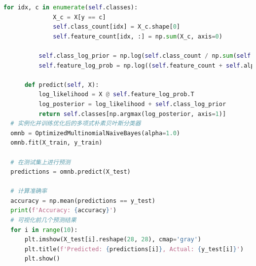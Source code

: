 \documentclass[12pt]{article}
\begin{document}
\begin{lstlisting}[language=Python]
          for idx, c in enumerate(self.classes):
              X_c = X[y == c]
              self.class_count[idx] = X_c.shape[0]
              self.feature_count[idx, :] = np.sum(X_c, axis=0)
  
          self.class_log_prior = np.log(self.class_count / np.sum(self.class_count))
          self.feature_log_prob = np.log((self.feature_count + self.alpha) / (self.class_count[:, None] + self.alpha * n_features))
  
      def predict(self, X):
          log_likelihood = X @ self.feature_log_prob.T
          log_posterior = log_likelihood + self.class_log_prior
          return self.classes[np.argmax(log_posterior, axis=1)]
  # 实例化并训练优化后的多项式朴素贝叶斯分类器
  omnb = OptimizedMultinomialNaiveBayes(alpha=1.0)
  omnb.fit(X_train, y_train)
  
  # 在测试集上进行预测
  predictions = omnb.predict(X_test)
  
  # 计算准确率
  accuracy = np.mean(predictions == y_test)
  print(f'Accuracy: {accuracy}')
  # 可视化前几个预测结果
  for i in range(10):
      plt.imshow(X_test[i].reshape(28, 28), cmap='gray')
      plt.title(f'Predicted: {predictions[i]}, Actual: {y_test[i]}')
      plt.show()
  
\end{lstlisting}
\end{document}

